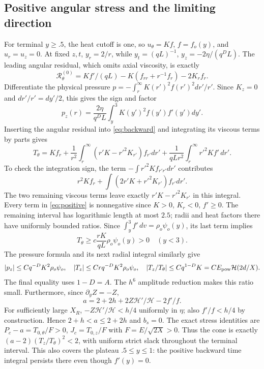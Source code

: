 \documentclass[10pt,a4paper]{article}
\newcommand{\hh}{\mathcal H}
\newcommand{\res}{\mathcal R}
\begin{document}
\subsection{Positive angular stress and the limiting direction}
For terminal $y\ge.5$, the heat cutoff is one, so $u_\theta=Kf$, $f=f_o(y)$,
and $u_r=u_z=0$. At fixed $z,t$, $y_r=2/r$, while
$y_t=(qL)^{-1}$, $y_z=-2\eta/(q^DL)$. The leading angular residual,
which omits axial viscosity, is exactly
\[
\res_\theta^{(0)}=Kf'/(qL)-K(f_{rr}+r^{-1}f_r)-2K_rf_r.
\]
Differentiate the physical pressure $p=-\int_r^\infty K(r')^2f(r')^2dr'/r'$.
Since $K_z=0$ and $dr'/r'=dy'/2$, this gives the sign and factor
\[
p_z(r)=\frac{2\eta}{q^DL}\int_y^3K(y')^2f(y')f'(y')dy'.
\]
Inserting the angular residual into \eqref{eq:backward} and integrating its
viscous terms by parts gives
\begin{equation}\label{eq:positive}
T_\theta=Kf_r+\frac1{r^2}\int_r^\infty(r'K-r'^2K_{r'})f_{r'}dr'
+\frac1{qLr^2}\int_r^\infty r'^2Kf'\,dr'.
\end{equation}
To check the integration sign, the term $-\int r'^2Kf_{r'r'}dr'$ contributes
\[
r^2Kf_r+\int(2r'K+r'^2K_{r'})f_{r'}dr'.
\]
The two remaining
viscous terms leave exactly $r'K-r'^2K_{r'}$ in this integral.
Every term in \eqref{eq:positive} is nonnegative since $K>0$, $K_r<0$,
$f'\ge0$. The remaining interval has logarithmic length at most $2.5$;
radii and heat factors there have uniformly bounded ratios. Since
$\int_y^3f'\,dv=\rho_o\psi_o(y)$, its last term implies
\[
T_\theta\ge c\frac{rK}{qL}\rho_o\psi_o(y)>0\quad(y<3).
\]
The pressure formula and its next radial integral similarly give
\[
|p_z|\le Cq^{-D}K^2\rho_o\psi_o,
\quad |T_z|\le Crq^{-D}K^2\rho_o\psi_o,
\quad |T_z/T_\theta|\le Cq^{1-D}K=C E_{\rm pow}\hh(2d/X).
\]
The final equality uses $1-D=A$. The $h^6$ amplitude reduction makes this
ratio small. Furthermore, since $\partial_yZ=-Z$,
\[
a=2+2h+2Z\hh'/\hh-2f'/f.
\]
For sufficiently large $X_R$, $-Z\hh'/\hh<h/4$ uniformly in $\eta$;
also $f'/f<h/4$ by construction. Hence $2+h<a\le2+2h$ and $b_s=0$.
The exact stress identities are
$P_c-a=T_{0,\theta}/F>0$, $J_c=T_{0,z}/F$ with $F=E/\sqrt{2X}>0$.
Thus the cone is exactly $(a-2)(T_z/T_\theta)^2<2$, with uniform strict
slack throughout the terminal interval. This also covers the plateau $.5\le y\le1$:
the positive backward time integral persists there even though $f'(y)=0$.
\end{document}
